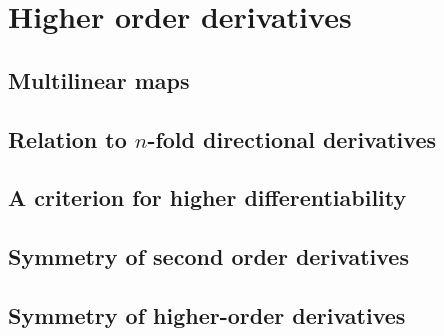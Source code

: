 \section{Higher order derivatives}

\subsection{Multilinear maps}

\subsection{Relation to $n$-fold directional derivatives}

\subsection{A criterion for higher differentiability}

\subsection{Symmetry of second order derivatives}

\subsection{Symmetry of higher-order derivatives}
